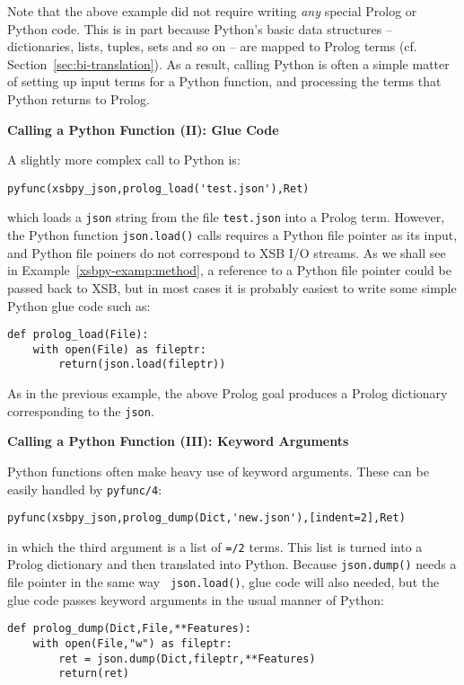 Note that the above example did not require writing {\em any} special
Prolog or Python code.  This is in part because Python's basic data
structures -- dictionaries, lists, tuples, sets and so on -- are
mapped to Prolog terms (cf. Section~\ref{sec:bi-translation}).  As a
result, calling Python is often a simple matter of setting up input
terms for a Python function, and processing the terms that Python
returns to Prolog.

\begin{example} \rm {\bf Calling a Python Function (II): Glue Code} \label{xsbpy-examp:glue}

\noindent
  A slightly more complex call to Python is:
 \begin{verbatim}
pyfunc(xsbpy_json,prolog_load('test.json'),Ret)
\end{verbatim}

\noindent
which loads a {\tt json} string from the file {\tt test.json} into a
Prolog term.  However, the Python function {\tt json.load()} calls
requires a Python file pointer as its input, and Python file poiners
do not correspond to XSB I/O streams.  As we shall see in
Example~\ref{xsbpy-examp:method}, a reference to a Python file pointer
could be passed back to XSB, but in most cases it is probably easiest
to write some simple Python glue code such as:

\begin{verbatim}   
def prolog_load(File):
    with open(File) as fileptr:
        return(json.load(fileptr))
\end{verbatim}
\noindent
As in the previous example, the above Prolog goal produces a Prolog
dictionary corresponding to the {\tt json}.
\end{example}

\begin{example} \rm {\bf Calling a Python Function (III): Keyword Arguments}
  
\noindent
Python functions often make heavy use of keyword arguments.  These can
be easily handled by {\tt pyfunc/4}:
\begin{verbatim}
pyfunc(xsbpy_json,prolog_dump(Dict,'new.json'),[indent=2],Ret)
\end{verbatim}

\noindent
in which the third argument is a list of {\tt =/2} terms.  This list
is turned into a Prolog dictionary and then translated into Python.
Because {\tt json.dump()} needs a file pointer in the same way {\tt
  json.load()}, glue code will also needed, but the glue code passes
keyword arguments in the usual manner of Python:
\begin{verbatim}
def prolog_dump(Dict,File,**Features):
    with open(File,"w") as fileptr:
        ret = json.dump(Dict,fileptr,**Features)
        return(ret)
\end{verbatim}
\end{example}

